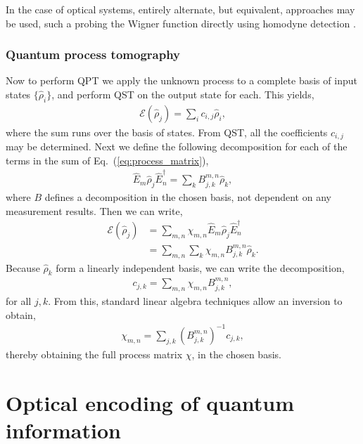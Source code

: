 \documentclass[aps,rmp,twocolumn,amsmath,amssymb,nofootinbib,superscriptaddress,longbibliography,floatfix,table-of-contents,eqsecnum]{revtex4-1}
\begin{document}
In the case of optical systems, entirely alternate, but equivalent, approaches may be used, such a probing the Wigner function directly using homodyne detection \cite{???}.

%
%

\subsubsection{Quantum process tomography} 

Now to perform QPT we apply the unknown process to a complete basis of input states $\{\hat\rho_i\}$, and perform QST on the output state for each. This yields,
\begin{align}
\mathcal{E}(\hat\rho_j) = \sum_{i} c_{i,j} \hat\rho_i,
\end{align}
where the sum runs over the basis of states. From QST, all the coefficients $c_{i,j}$ may be determined. Next we define the following decomposition for each of the terms in the sum of Eq.~(\ref{eq:process_matrix}),
\begin{align}
\hat{E}_m \hat\rho_j \hat{E}_n^\dag = \sum_k B^{m,n}_{j,k} \hat\rho_k,
\end{align}
where $B$ defines a decomposition in the chosen basis, not dependent on any measurement results. Then we can write,
\begin{align}
\mathcal{E}(\hat\rho_j) &= \sum_{m,n} \chi_{m,n} \hat{E}_m\hat\rho_j\hat{E}_n^\dag \nonumber \\
&= \sum_{m,n} \sum_k \chi_{m,n} B^{m,n}_{j,k} \hat\rho_k.
\end{align}
Because $\hat\rho_k$ form a linearly independent basis, we can write the decomposition,
\begin{align}
c_{j,k} = \sum_{m,n} \chi_{m,n} B_{j,k}^{m,n},
\end{align}
for all \mbox{$j,k$}. From this, standard linear algebra techniques allow an inversion to obtain,
\begin{align}
\chi_{m,n} = \sum_{j,k} (B_{j,k}^{m,n})^{-1} c_{j,k},
\end{align}
thereby obtaining the full process matrix $\chi$, in the chosen basis.

%
%

\section{Optical encoding of quantum information} \label{sec:opt_enc_of_qi} 
\end{document}
